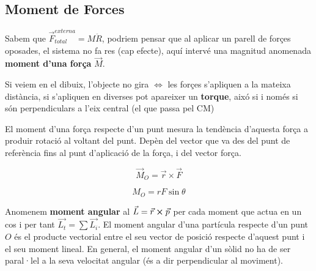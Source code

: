 \documentclass[12pt]{article}
\begin{document}
\subsection{Moment de Forces}

Sabem que $\vec{F}_{total}^{externa} = M \ddot{R}$, podriem pensar que al aplicar un parell de forçes oposades, el sistema no fa res (cap efecte), aquí intervé una magnitud anomenada \textbf{moment d'una força} $\vec{M}$.

\begin{center}
\end{center}

Si veiem en el dibuix, l'objecte no gira $\Leftrightarrow$ les forçes s'apliquen a la mateixa distància, si s'apliquen en diverses pot apareixer un \textbf{torque}, aixó si i només si són perpendiculars a l'eix central (el que passa pel CM)

El moment d’una força respecte d’un punt mesura la tendència d’aquesta força a produir rotació al voltant del punt. Depèn del vector que va des del punt de referència fins al punt d’aplicació de la força, i del vector força.

\[
\vec M_O=\vec r\times\vec F
\]

\[
M_O=rF\sin\theta
\]

\begin{center}
\end{center}

Anomenem \textbf{moment angular} al $\vec{L} = \vec{r} \cross \vec{p}$ per cada moment que actua en un cos i per tant $\vec{L_t} = \sum \vec{L_i}$. El moment angular d’una partícula respecte d’un punt \(O\) és el producte vectorial entre el seu vector de posició respecte d’aquest punt i el seu moment lineal. En general, el moment angular d’un sòlid no ha de ser paral·lel a la seva velocitat angular (és a dir perpendicular al moviment).
\end{document}

